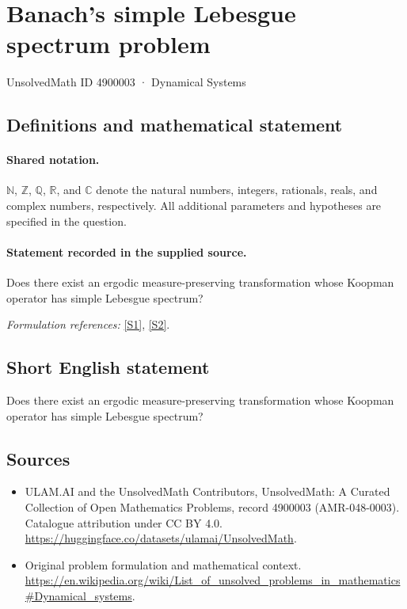 \documentclass[11pt]{article}
\newcommand{\sref}[2]{\hyperlink{source:#1:#2}{[S#2]}}
\begin{document}
\setcounter{section}{4900002}
\section{Banach's simple Lebesgue spectrum problem}\label{4900003}
{\small UnsolvedMath ID 4900003 · Dynamical Systems}
\subsection{Definitions and mathematical statement}

\paragraph{Shared notation.}$\mathbb N$, $\mathbb Z$, $\mathbb Q$, $\mathbb R$, and $\mathbb C$ denote the natural numbers, integers, rationals, reals, and complex numbers, respectively. All additional parameters and hypotheses are specified in the question.


\paragraph{Statement recorded in the supplied source.}
Does there exist an ergodic measure-preserving transformation whose Koopman operator has simple Lebesgue spectrum?
\par\smallskip\textit{Formulation references:} \sref{4900003}{1}, \sref{4900003}{2}.
\subsection{Short English statement}
Does there exist an ergodic measure-preserving transformation whose Koopman operator has simple Lebesgue spectrum?
\subsection{Sources}
\begin{itemize}
\item[\hypertarget{source:4900003:1}{S1}] ULAM.AI and the UnsolvedMath Contributors, UnsolvedMath: A Curated Collection of Open Mathematics Problems, record 4900003 (AMR-048-0003). Catalogue attribution under CC BY 4.0.
\url{https://huggingface.co/datasets/ulamai/UnsolvedMath}.
\item[\hypertarget{source:4900003:2}{S2}] Original problem formulation and mathematical context.
\url{https://en.wikipedia.org/wiki/List_of_unsolved_problems_in_mathematics#Dynamical_systems}.
\end{itemize}
\label{end:4900003}
\end{document}
